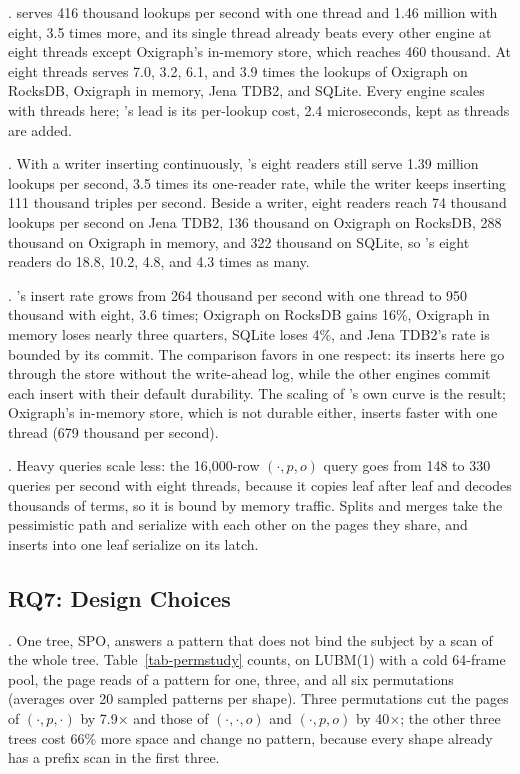 

.
\sys serves 416 thousand lookups per second with one thread and 1.46 million
with eight, 3.5 times more, and its single thread already beats every other
engine at eight threads except Oxigraph's in-memory store, which reaches 460
thousand.
At eight threads \sys serves 7.0, 3.2, 6.1, and 3.9 times the lookups of
Oxigraph on RocksDB, Oxigraph in memory, Jena TDB2, and SQLite.
Every engine scales with threads here; \sys's lead is its per-lookup cost, 2.4
microseconds, kept as threads are added.

.
With a writer inserting continuously, \sys's eight readers still serve 1.39
million lookups per second, 3.5 times its one-reader rate, while the writer
keeps inserting 111 thousand triples per second.
Beside a writer, eight readers reach 74 thousand lookups per second on Jena
TDB2, 136 thousand on Oxigraph on RocksDB, 288 thousand on Oxigraph in memory,
and 322 thousand on SQLite, so \sys's eight readers do 18.8, 10.2, 4.8, and 4.3
times as many.

.
\sys's insert rate grows from 264 thousand per second with one thread to 950
thousand with eight, 3.6 times; Oxigraph on RocksDB gains 16\%, Oxigraph in
memory loses nearly three quarters, SQLite loses 4\%, and Jena TDB2's rate is bounded by
its commit.
The comparison favors \sys in one respect: its inserts here go through the
store without the write-ahead log, while the other engines commit each insert
with their default durability.
The scaling of \sys's own curve is the result; Oxigraph's in-memory store, which
is not durable either, inserts faster with one thread (679 thousand per
second).

.
Heavy queries scale less: the 16,000-row $(\cdot,p,o)$ query goes from 148 to 330
queries per second with eight threads, because it copies leaf after leaf and
decodes thousands of terms, so it is bound by memory traffic.
Splits and merges take the pessimistic path and serialize with each other on
the pages they share, and inserts into one leaf serialize on its latch.

\subsection{RQ7: Design Choices}

.
One tree, SPO, answers a pattern that does not bind the subject by a scan of
the whole tree.
Table~\ref{tab-permstudy} counts, on LUBM(1) with a cold 64-frame pool, the
page reads of a pattern for one, three, and all six permutations (averages
over 20 sampled patterns per shape).
Three permutations cut the pages of $(\cdot,p,\cdot)$ by 7.9$\times$ and those
of $(\cdot,\cdot,o)$ and $(\cdot,p,o)$ by 40$\times$; the other three trees
cost 66\% more space and change no pattern, because every shape already has
a prefix scan in the first three.

